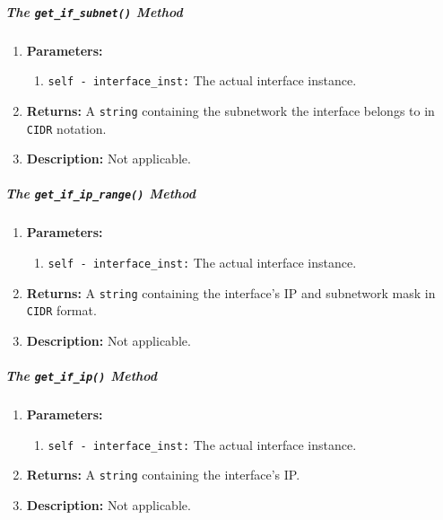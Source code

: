                    \subparagraph{The \texttt{get\_if\_subnet()} Method}
                        \begin{enumerate}
                            \item \textbf{Parameters:}
                            \begin{enumerate}
                                \item \texttt{self - interface\_inst:} The actual interface instance.
                            \end{enumerate}
                            \item \textbf{Returns:} A \texttt{string} containing the subnetwork the interface belongs to in \texttt{CIDR} notation.
                            \item \textbf{Description:} Not applicable.
                        \end{enumerate}

                    \subparagraph{The \texttt{get\_if\_ip\_range()} Method}
                        \begin{enumerate}
                            \item \textbf{Parameters:}
                            \begin{enumerate}
                                \item \texttt{self - interface\_inst:} The actual interface instance.
                            \end{enumerate}
                            \item \textbf{Returns:} A \texttt{string} containing the interface's IP and subnetwork mask in \texttt{CIDR} format.
                            \item \textbf{Description:} Not applicable.
                        \end{enumerate}

                    \subparagraph{The \texttt{get\_if\_ip()} Method}
                        \begin{enumerate}
                            \item \textbf{Parameters:}
                            \begin{enumerate}
                                \item \texttt{self - interface\_inst:} The actual interface instance.
                            \end{enumerate}
                            \item \textbf{Returns:} A \texttt{string} containing the interface's IP.
                            \item \textbf{Description:} Not applicable.
                        \end{enumerate}


